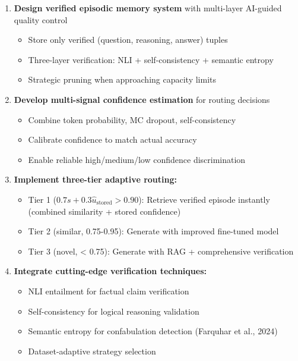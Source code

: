 \documentclass[12pt,a4paper]{article}
\theoremstyle{definition}
\newcommand{\ustored}{\hat{u}_{\text{stored}}}
\begin{document}
\begin{enumerate}
    \item \textbf{Design verified episodic memory system} with multi-layer AI-guided quality control
    \begin{itemize}
        \item Store only verified (question, reasoning, answer) tuples
        \item Three-layer verification: NLI + self-consistency + semantic entropy
        \item Strategic pruning when approaching capacity limits
    \end{itemize}
    
    \item \textbf{Develop multi-signal confidence estimation} for routing decisions
    \begin{itemize}
        \item Combine token probability, MC dropout, self-consistency
        \item Calibrate confidence to match actual accuracy
        \item Enable reliable high/medium/low confidence discrimination
    \end{itemize}
    
    \item \textbf{Implement three-tier adaptive routing:}
    \begin{itemize}
        \item Tier 1 ($0.7s + 0.3\ustored > 0.90$): Retrieve verified episode instantly (combined similarity + stored confidence)
        \item Tier 2 (similar, 0.75-0.95): Generate with improved fine-tuned model
        \item Tier 3 (novel, < 0.75): Generate with RAG + comprehensive verification
    \end{itemize}
    
    \item \textbf{Integrate cutting-edge verification techniques:}
    \begin{itemize}
        \item NLI entailment for factual claim verification
        \item Self-consistency for logical reasoning validation
        \item Semantic entropy for confabulation detection (Farquhar et al., 2024)
        \item Dataset-adaptive strategy selection
    \end{itemize}
    

\end{enumerate}
\end{document}
